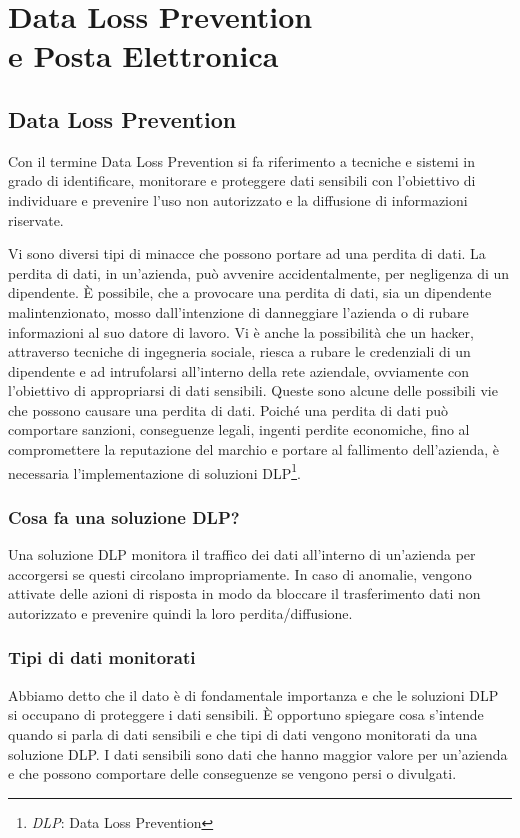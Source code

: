\chapter{Data Loss Prevention \\e Posta Elettronica}

\section{Data Loss Prevention}
Con il termine Data Loss Prevention si fa riferimento a 
tecniche e sistemi in grado di identificare, monitorare 
e proteggere dati sensibili con l’obiettivo di individuare 
e prevenire l’uso non autorizzato e la diffusione di informazioni riservate. 

Vi sono diversi tipi di minacce che possono portare ad una perdita di dati.
La perdita di dati, in un'azienda, può avvenire accidentalmente, per negligenza di un 
dipendente. È possibile, che a provocare una perdita di dati, sia un dipendente malintenzionato,
mosso dall'intenzione di danneggiare l'azienda o di rubare informazioni al suo datore di lavoro.
Vi è anche la possibilità che un hacker, attraverso tecniche di ingegneria sociale, riesca a rubare
le credenziali di un dipendente e ad intrufolarsi all'interno della rete aziendale, ovviamente con 
l'obiettivo di appropriarsi di dati sensibili.
Queste sono alcune delle possibili vie che possono causare una perdita di dati. Poiché una perdita di dati
può comportare sanzioni, conseguenze legali, ingenti perdite economiche, fino al compromettere la reputazione del 
marchio e portare al fallimento dell'azienda, è necessaria l'implementazione di soluzioni
DLP\footnote{\textit{DLP}: Data Loss Prevention}.
 

\subsection{Cosa fa una soluzione DLP?}
    Una soluzione DLP monitora il traffico dei dati all'interno di un'azienda per accorgersi se
    questi circolano impropriamente. In caso di anomalie, vengono attivate delle azioni di risposta 
    in modo da bloccare il trasferimento dati non autorizzato e prevenire quindi la loro perdita/diffusione.
    \cite{OpenLab}


\subsection{Tipi di dati monitorati}
    Abbiamo detto che il dato è di fondamentale importanza e che le soluzioni DLP si occupano di proteggere i dati sensibili.
    È opportuno spiegare cosa s'intende quando si parla di dati sensibili e che tipi di dati vengono monitorati 
    da una soluzione DLP. I dati sensibili sono dati che hanno maggior valore per un'azienda e che possono comportare 
    delle conseguenze se vengono persi o divulgati.

